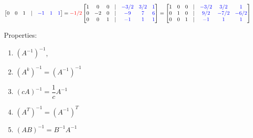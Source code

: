 \documentclass[reqno]{amsart}
\theoremstyle{definition}
\begin{document}
\begin{enumerate}
\begin{align*}
\begin{bmatrix}
0 & 0 & 1 & | & {\color{blue}-1} & {\color{blue}1} & {\color{blue}1}
\end{bmatrix} = \begin{matrix}
\\
{\color{red}-1/2}\\
\\
\end{matrix}\begin{bmatrix}
1 & 0 & 0 & | & {\color{blue}-3/2} & {\color{blue}3/2} & {\color{blue}1}\\
0 & -2 & 0 & | & {\color{blue}-9} & {\color{blue}7} & {\color{blue}6}\\
0 & 0 & 1 & | & {\color{blue}-1} & {\color{blue}1} & {\color{blue}1}
\end{bmatrix} = \begin{bmatrix}
1 & 0 & 0 & | & {\color{blue}-3/2} & {\color{blue}3/2} & {\color{blue}1}\\
0 & 1 & 0 & | & {\color{blue}9/2} & {\color{blue}-7/2} & {\color{blue}-6/2}\\
0 & 0 & 1 & | & {\color{blue}-1} & {\color{blue}1} & {\color{blue}1}
\end{bmatrix}
\end{align*}

\end{enumerate}

Properties:
%
\begin{enumerate}
\item  $\left(A^{-1}\right)^{-1}$,
\item  $\left(A^k\right)^{-1} = \left(A^{-1}\right)^{-1}$
\item  $(cA)^{-1} = \dfrac{1}{c}A^{-1}$
\item  $\left(A^T\right)^{-1} = \left(A^{-1}\right)^T$
\item  $(AB)^{-1} = B^{-1}A^{-1}$
\end{enumerate}
\end{document}
